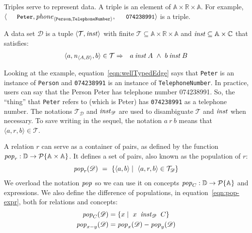 \documentclass[runningheads]{llncs}
\newcommand{\id}[1]{\text{\it #1\/}}
\newcommand{\popF}[1]{\id{pop}_{#1}}
\newcommand{\pop}[2]{\popF{#1}(#2)}
\newcommand{\instance}{\mathbin{\id{inst}}}
\newcommand{\powerset}[1]{\cal{P}\{#1\}}
\newcommand{\declare}[3]{\id{#1}_{\pair{#2}{#3}}}
\newcommand{\pair}[2]{\langle{#1},{#2}\rangle}
\newcommand{\Pair}[2]{#1\times#2}
\newcommand{\triple}[3]{\langle{#1},{#2},{#3}\rangle}
\newcommand{\atom}[1]{{\tt\small #1}}
\newcommand{\Atoms}{\mathbb{A}}
\newcommand{\Concepts}{\mathbb{C}}
\newcommand{\Rels}{\mathbb{R}}   %
\newcommand{\triples}{\mathcal{T}}
\newcommand{\Triple}[3]{#1\times#2\times#3}
\newcommand{\dataset}{\mathscr{D}}
\newcommand{\Dataset}{\mathbb{D}}
\begin{document}
   Triples serve to represent data.
   A triple %
   is an element of $\Triple{\Atoms}{\Rels}{\Atoms}$.
   For example, $\triple{\text{\atom{Peter}}}{\declare{\id{phone}}{\tt Person}{\tt TelephoneNumber}}{\text{\atom{074238991}}}$ is a triple.
   
   \begin{definition}
   A data set $\dataset$ is a tuple $\pair{\triples}{\instance}$ with finite $\triples \subseteq {\Triple{\Atoms}{\Rels}{\Atoms}}$ and $\instance\subseteq\Pair{\Atoms}{\Concepts}$ that satisfies:
\begin{eqnarray}
   \triple{a}{\declare{n}{A}{B}}{b}\in\triples&\Rightarrow&a\instance A\ \wedge\ b\instance B
   \label{eqn:wellTypedEdge}
\end{eqnarray}
\end{definition}
   Looking at the example,
   equation~\ref{eqn:wellTypedEdge} says that \atom{Peter} is an instance of {\tt Person} and \atom{074238991} is an instance of {\tt TelephoneNumber}.
   In practice, users can say that the Person Peter has telephone number 074238991.
   So, the ``thing'' that \atom{Peter} refers to (which is Peter) has \atom{074238991} as a telephone number.
   The notations $\triples_{\dataset}$ and $\instance_{\dataset}$ are used to disambiguate $\triples$ and $\instance$ when necessary.
   To save writing in the sequel, the notation $a\ r\ b$ means that $\triple{a}{r}{b}\in\triples$.

   A relation $r$ can serve as a container of pairs,
   as defined by the function $\popF{r}:\Dataset\rightarrow\powerset{\Pair{\Atoms}{\Atoms}}$.
   It defines a set of pairs, also known as the population of $r$:
\begin{equation}
   \pop{r}{\dataset}\ =\ \{ \pair{a}{b}\mid\ \triple{a}{r}{b}\in\triples_{\dataset}\}
\label{eqn:pop-rel}
\end{equation}
%
   We overload the notation $\popF{}$ so we can use it on concepts $\popF{C}:\Dataset\rightarrow\powerset{\Atoms}$
   and expressions. We also define the difference of populations, in equation~\ref{eqn:pop-expr}, both for relations and concepts:
\begin{align}
   \pop{C}{\dataset}&= \{ x\mid\ x\ \instance_{\dataset}\ C\}
\label{eqn:pop-concept}\\
   \pop{x-y}{\dataset}&= \pop{x}{\dataset} - \pop{y}{\dataset}
\label{eqn:pop-expr}
\end{align}
\end{document}
